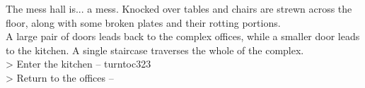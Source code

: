 The mess hall is... a mess. Knocked over tables and chairs are strewn across the floor, along with some broken plates and their rotting portions.\\

A large pair of doors leads back to the complex offices, while a smaller door leads to the kitchen. A single staircase traverses the whole of the complex.\\

> Enter the kitchen -- turnto{c323}\\
> Return to the offices -- 